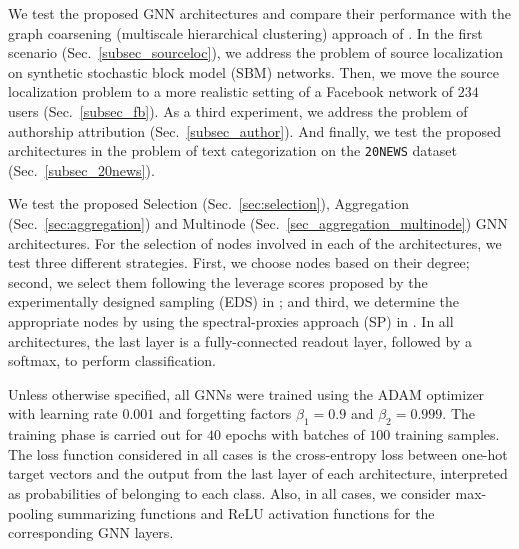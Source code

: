 

We test the proposed GNN architectures and compare their performance with the graph coarsening (multiscale hierarchical clustering) approach of \cite{defferrard17-cnngraphs}. In the first scenario (Sec.~\ref{subsec_sourceloc}), we address the problem of source localization on synthetic stochastic block model (SBM) networks. Then, we move the source localization problem to a more realistic setting of a Facebook network of $234$ users (Sec.~\ref{subsec_fb}). As a third experiment, we address the problem of authorship attribution (Sec.~\ref{subsec_author}). And finally, we test the proposed architectures in the problem of text categorization on the \texttt{20NEWS} dataset (Sec.~\ref{subsec_20news}).

We test the proposed Selection (Sec.~\ref{sec:selection}), Aggregation (Sec.~\ref{sec:aggregation}) and Multinode (Sec.~\ref{sec_aggregation_multinode}) GNN architectures. For the selection of nodes involved in each of the architectures, we test three different strategies. First, we choose nodes based on their degree; second, we select them following the leverage scores proposed by the experimentally designed sampling (EDS) in \cite{varma15-scores}; and third, we determine the appropriate nodes by using the spectral-proxies approach (SP) in \cite{anis16-spectralproxies}.  In all architectures, the last layer is a fully-connected readout layer, followed by a softmax, to perform classification.

Unless otherwise specified, all GNNs were trained using the ADAM optimizer \cite{kingma17-adam} with learning rate $0.001$ and forgetting factors $\beta_{1}=0.9$ and $\beta_{2}=0.999$. The training phase is carried out for $40$ epochs with batches of $100$ training samples. The loss function considered in all cases is the cross-entropy loss between one-hot target vectors and the output from the last layer of each architecture, interpreted as probabilities of belonging to each class. Also, in all cases, we consider max-pooling summarizing functions and ReLU activation functions for the corresponding GNN layers.

